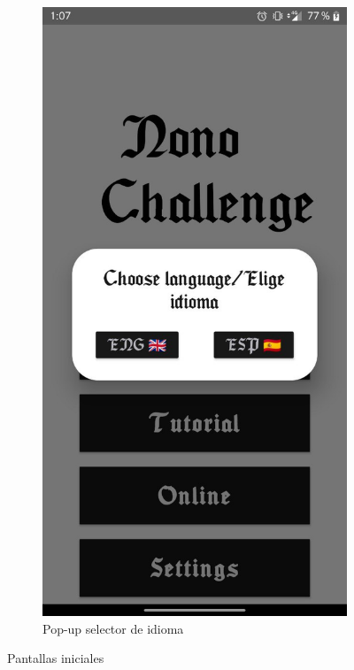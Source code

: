 \begin{figure}[H]
\begin{subfigure}[b]{0.36\linewidth}
    \end{subfigure}
    \begin{subfigure}[b]{0.36\linewidth}
      \includegraphics[width=\linewidth]{images/man2.jpeg}
      \caption{Pop-up selector de idioma}
      \label{fig:man1-2}
    \end{subfigure}
    \caption{Pantallas iniciales}
    \label{fig:man1}
  \end{figure}

